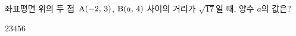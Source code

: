 좌표평면 위의 두 점~$\mathrm{A}(-2,\,3)$, $\mathrm{B}(a,\,4)$ 사이의 거리가 $\sqrt{17}$일 때, 양수 $a$의 값은?
\begin{choices32}{$2$}{$3$}{$4$}{$5$}{$6$}\end{choices32}
